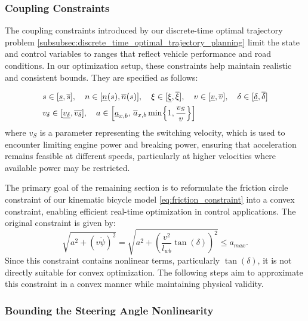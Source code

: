 \subsubsection{Coupling Constraints} \label{sec:kst_coupling_constraints}
The coupling constraints introduced by our discrete-time optimal trajectory problem \ref{subsubsec:discrete_time_optimal_trajectory_planning} limit
the state and control variables to ranges that reflect vehicle performance and road conditions.
In our optimization setup, these constraints help maintain realistic and consistent bounds.
They are specified as follows:

\begin{align}
	 & s \in [\underline{s}, \overline{s}], \quad n \in [\underline{n}(s), \overline{n}(s)], \quad \xi
	\in [\underline{\xi}, \overline{\xi}], \quad v \in [\underline{v}, \overline{v}], \quad \delta \in [\underline{\delta}, \overline{\delta}] \label{eq:coupling_kst_0} \\
	 & v_\delta \in [\underline{v_\delta}, \overline{v_\delta}], \quad a \in \Bigl[\underline{a}_{x,b},\, \overline{a}_{x,b}\min\Bigl\{1,
		\frac{v_S}{v}\Bigr\}\Bigr] \label{eq:coupling_kst_1}
\end{align}
where $ v_S $ is a parameter representing the switching velocity, which is used to encounter limiting engine power and
breaking power, ensuring that acceleration remains feasible at different speeds, particularly at higher velocities where
available power may be restricted.

The primary goal of the remaining section is to reformulate the friction circle constraint of our kinematic bicycle model
\eqref{eq:friction_constraint} into a convex constraint, enabling efficient real-time optimization in control applications.
The original constraint is given by:
\begin{equation}
	\label{eq:friction_circle}
	\sqrt{a^2 + \left(v\dot{\psi}\right)^2} = \sqrt{a^2 + \left(\frac{v^2}{l_{wb}} \tan(\delta)\right)^2} \leq a_{max}.
\end{equation}
Since this constraint contains nonlinear terms, particularly \( \tan(\delta) \), it is not directly suitable for convex optimization.
The following steps aim to approximate this constraint in a convex manner while maintaining physical validity.

\subsubsection{Bounding the Steering Angle Nonlinearity}

